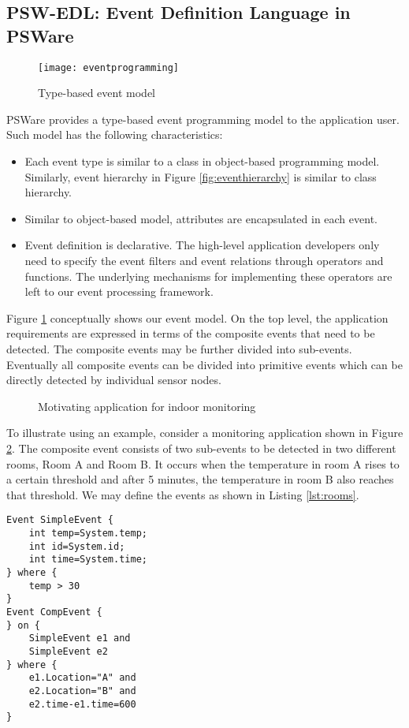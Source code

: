 \subsection{PSW-EDL: Event Definition Language in PSWare}
\begin{figure}
\centering
\texttt{[image: eventprogramming]}
\caption{Type-based event model}
\label{fig:eventprogramming}
\end{figure}

PSWare provides a type-based event programming model to the application user. Such model has the following characteristics:
\begin{itemize}
\item Each event type is similar to a class in object-based programming model. Similarly, event hierarchy in Figure \ref{fig:eventhierarchy} is similar to class hierarchy.
\item Similar to object-based model, attributes are encapsulated in each event.
\item Event definition is declarative. The high-level application developers only need to specify the event filters and event relations through operators and functions. The underlying mechanisms for implementing these operators are left to our event processing framework.
\end{itemize}

Figure \ref{fig:eventprogramming} conceptually shows our event model. On the top level, the application requirements are expressed in terms of the composite events that need to be detected. The composite events may be further divided into sub-events. Eventually all composite events can be divided into primitive events which can be directly detected by individual sensor nodes.

\begin{figure}
\centering
{}
\caption{Motivating application for indoor monitoring}
\label{fig:rooms}
\end{figure}

To illustrate using an example, consider a monitoring application shown in Figure \ref{fig:rooms}. The composite event consists of two sub-events to be detected in two different rooms, Room A and Room B. It occurs when the temperature in room A rises to a certain threshold and after 5 minutes, the temperature in room B also reaches that threshold. We may define the events as shown in Listing \ref{lst:rooms}.
\begin{lstlisting}[caption=Example of using event-based programming model, float, label=lst:rooms]
Event SimpleEvent {
	int temp=System.temp;
	int id=System.id;
	int time=System.time;
} where {
	temp > 30
}
Event CompEvent {
} on {
	SimpleEvent e1 and
	SimpleEvent e2
} where {
	e1.Location="A" and
	e2.Location="B" and
	e2.time-e1.time=600
}
\end{lstlisting}

